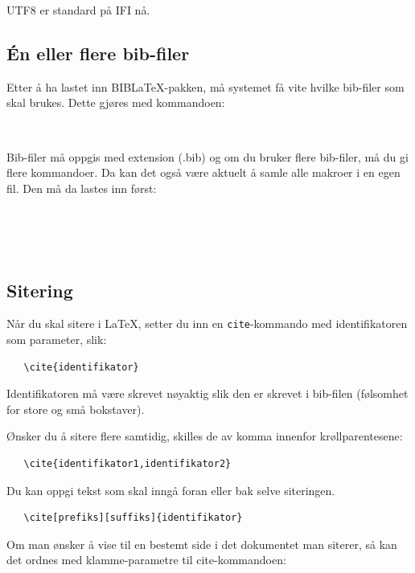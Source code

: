 \documentclass[11pt,norsk,a4paper]{article}
\newcommand{\blt}{B{\smaller[2]IB}\discretionary{-}{}{\kern
    -0.12em}\LaTeX{}}
\begin{document}
UTF8 er standard på IFI nå.

\subsection{Én eller flere bib-filer}
Etter å ha lastet inn \blt{}-pakken, må systemet få vite hvilke
bib-filer som skal brukes. Dette gjøres med kommandoen:

{\footnotesize\begin{verbatim}
    
\end{verbatim}}

Bib-filer må oppgis med extension (.bib) og om du bruker flere
bib-filer, må du gi flere kommandoer. Da kan det også være aktuelt å samle
alle makroer i en egen fil. Den må da lastes inn først:

{\footnotesize\begin{verbatim}
    
    
    
\end{verbatim}}

\subsection{Sitering}
Når du skal sitere i \LaTeX, setter du inn en \texttt{cite}-kommando
med identifikatoren som parameter, slik:

{\footnotesize\begin{verbatim}
   \cite{identifikator}
\end{verbatim}}

\noindent Identifikatoren må være skrevet nøyaktig slik den er skrevet
i bib-filen (følsomhet for store og små bokstaver).

Ønsker du å sitere flere samtidig, skilles de av komma innenfor
krøllparentesene: 

{\footnotesize\begin{verbatim}
   \cite{identifikator1,identifikator2}
\end{verbatim}}

\noindent Du kan oppgi tekst som skal inngå foran eller bak selve
siteringen.

{\footnotesize\begin{verbatim}
   \cite[prefiks][suffiks]{identifikator}
\end{verbatim}}

\noindent Om man ønsker å vise til en bestemt side i det dokumentet
man siterer, så kan det ordnes med klamme-parametre til
cite-kommandoen:
\end{document}
